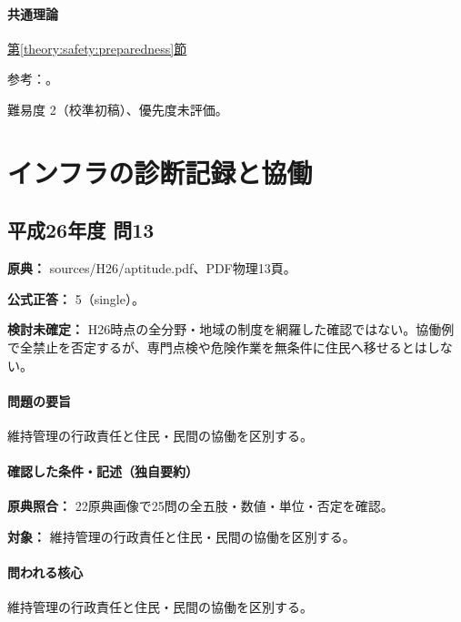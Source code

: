 \paragraph{共通理論} \hyperref[theory:safety:preparedness]{第\ref*{theory:safety:preparedness}節}

\par 参考：\cite{env_ar5,env_rain2017,env_evac2021,env_warning2026}。

\par 難易度 2（校準初稿）、優先度未評価。

\section{インフラの診断記録と協働}

\subsection{平成26年度 問13}
\label{q:h26-reg-apt-13}

\noindent\textbf{原典：} sources/H26/aptitude.pdf、PDF物理13頁。

\textbf{公式正答：} 5（single）。

\par\textbf{検討未確定：} H26時点の全分野・地域の制度を網羅した確認ではない。協働例で全禁止を否定するが、専門点検や危険作業を無条件に住民へ移せるとはしない。

\paragraph{問題の要旨} 維持管理の行政責任と住民・民間の協働を区別する。

\paragraph{確認した条件・記述（独自要約）}\mbox{}\par

\noindent\textbf{原典照合：} 22原典画像で25問の全五肢・数値・単位・否定を確認。\par

\noindent\textbf{対象：} 維持管理の行政責任と住民・民間の協働を区別する。\par

\paragraph{問われる核心} 維持管理の行政責任と住民・民間の協働を区別する。

